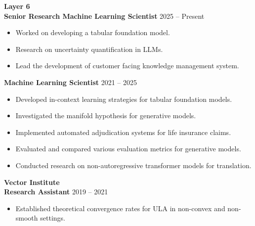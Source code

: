 \documentclass[11pt,a4paper]{article}
\begin{document}
{\Large \textbf{\textcolor{maincolor}{Layer 6}}} \\
\textbf{Senior Research Machine Learning Scientist} \hfill 2025 -- Present \\
\begin{itemize}[noitemsep, topsep=4pt, leftmargin=1.5em, label=\textcolor{maincolorlight}{$\circ$}]
    \item Worked on developing a tabular foundation model.
    \item Research on uncertainty quantification in LLMs.
    \item Lead the development of customer facing knowledge management system.
\end{itemize}
\textbf{Machine Learning Scientist} \hfill 2021 -- 2025
\begin{itemize}[noitemsep, topsep=4pt, leftmargin=1.5em, label=\textcolor{maincolorlight}{$\circ$}]
    \item Developed in-context learning strategies for tabular foundation models.
    \item Investigated the manifold hypothesis for generative models.
    \item Implemented automated adjudication systems for life insurance claims.
    \item Evaluated and compared various evaluation metrics for generative models.
    \item Conducted research on non-autoregressive transformer models for translation.
\end{itemize}
\vspace{10pt}

{\Large \textbf{\textcolor{maincolor}{Vector Institute}}} \\
\textbf{Research Assistant} \hfill 2019 -- 2021
\begin{itemize}[noitemsep, topsep=4pt, leftmargin=1.5em, label=\textcolor{maincolorlight}{$\circ$}]
    \item Established theoretical convergence rates for ULA in non-convex and non-smooth settings.
\end{itemize}
\vspace{15pt}
\end{document}
